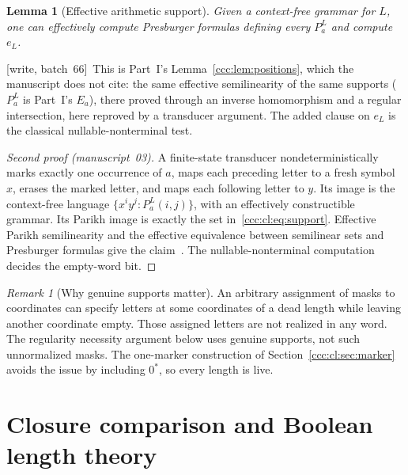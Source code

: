 \documentclass[11pt,letterpaper]{article}
\newtheorem{lemma}[theorem]{Lemma}
\theoremstyle{definition}
\theoremstyle{remark}
\newtheorem{remark}[theorem]{Remark}
\newcommand{\wsix}{\textup{[write, batch~66]}}
\begin{document}
\begin{lemma}[Effective arithmetic support]\label{ccc:cl:lem:presburger}
Given a context-free grammar for $L$, one can effectively compute
Presburger formulas defining every $P_a^L$ and compute $e_L$.
\end{lemma}
\wsix\ This is Part~I's Lemma~\ref{ccc:lem:positions}, which the manuscript
does not cite: the same effective semilinearity of the same supports
($P_a^L$ is Part~I's $E_a$), there proved through an inverse homomorphism and
a regular intersection, here reproved by a transducer argument. The added
clause on $e_L$ is the classical nullable-nonterminal test.
\begin{proof}[Second proof (manuscript~03)]
A finite-state transducer nondeterministically marks exactly one occurrence
of $a$, maps each preceding letter to a fresh symbol $x$, erases the marked
letter, and maps each following letter to $y$. Its image is the
context-free language
$\{x^i y^j:P_a^L(i,j)\}$, with an effectively constructible grammar.
Its Parikh image is exactly the set in~\eqref{ccc:cl:eq:support}. Effective
Parikh semilinearity and the effective equivalence between semilinear sets
and Presburger formulas give the claim~\cite{Parikh,EGKL,GinsburgSpanier}.
The nullable-nonterminal computation decides the empty-word bit.
\end{proof}

\begin{remark}[Why genuine supports matter]\label{ccc:cl:rem:genuine}
An arbitrary assignment of masks to coordinates can specify letters at some
coordinates of a dead length while leaving another coordinate empty. Those
assigned letters are not realized in any word. The regularity necessity
argument below uses genuine supports, not such unnormalized masks. The
one-marker construction of Section~\ref{ccc:cl:sec:marker} avoids the issue by
including $0^*$, so every length is live.
\end{remark}

\section{Closure comparison and Boolean length theory}\label{ccc:cl:sec:decisions}
\end{document}
